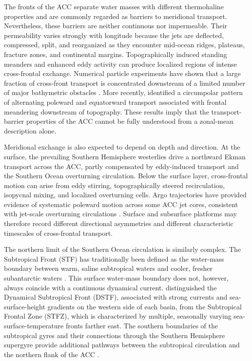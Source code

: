 \documentclass[
  draft
]{agujournal2025}
\begin{document}
    The fronts of the ACC separate water masses with different thermohaline properties and are commonly regarded as barriers to meridional transport. Nevertheless, these barriers are neither continuous nor impermeable. Their permeability varies strongly with longitude because the jets are deflected, compressed, split, and reorganized as they encounter mid-ocean ridges, plateaus, fracture zones, and continental margins. Topographically induced standing meanders and enhanced eddy activity can produce localized regions of intense cross-frontal exchange. Numerical particle experiments have shown that a large fraction of cross-front transport is concentrated downstream of a limited number of major bathymetric obstacles \cite{art:thompson2012}. More recently, \cite{art:denes2025} identified a circumpolar pattern of alternating poleward and equatorward transport associated with frontal meandering downstream of topography. These results imply that the transport-barrier properties of the ACC cannot be fully understood from a zonal-mean description alone. 
    
    Meridional exchange is also expected to depend on depth and direction. At the surface, the prevailing Southern Hemisphere westerlies drive a northward Ekman transport across the ACC, partly compensated by eddy-induced transport and the Southern Ocean overturning circulation. Below the surface layer, cross-frontal motion can arise from eddy stirring, topographically steered recirculation, isopycnal mixing, and localized overturning cells. Argo trajectories have provided evidence of systematic poleward motion across some ACC jet cores, consistent with jet-scale overturning circulations \cite{art:li2018}. Surface and subsurface platforms may therefore record different directional asymmetries and different characteristic timescales of cross-frontal transport. 
    
    The northern limit of the Southern Ocean circulation is similarly complex. The Subtropical Front (STF) has traditionally been defined as the water-mass boundary between warm, saline subtropical waters and cooler, fresher subantarctic waters \cite{art:orsi1995,art:belkin1996}. This surface water-mass boundary does not, however, always coincide with a continuous dynamical current. \cite{art:graham2013} distinguished the Dynamical Subtropical Front (DSTF), associated with strong currents and sea-surface-height gradients on the western side of each basin, from the Subtropical Frontal Zone (STFZ), which is characterized by multiple, seasonally varying sea-surface-temperature fronts farther east. The southern boundaries of the subtropical gyres and their connections through the Southern Hemisphere supergyre provide additional pathways between the subtropical circulation and the northern flank of the ACC \cite{art:ridgway2007,art:deboer2013}.
\end{document}
